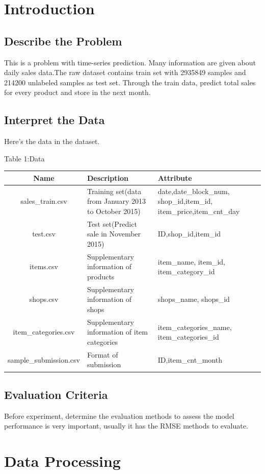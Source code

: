 \section{Introduction}\label{sec-intro}
\subsection{Describe the Problem}
\smallskip
This is a problem with time-series prediction. Many information are given about daily sales data.The raw dataset contains train set with 2935849 samples and 214200 unlabeled samples as test set. Through the train data, predict total sales for every product and store in the next month.
\subsection{Interpret the Data}
\smallskip
Here's the data in the dataset.\\
\bigskip
\centerline{\normalsize{Table 1:Data}}
\begin{tabular}{cp{4cm}p{4cm}}
	\hline
	Name&Description&Attribute\\
	\hline
	sales\_train.csv& Training set(data from January 2013 to October 2015)&date,date_block_num, shop_id,item_id, item_price,item_cnt_day\\
	test.csv& Test set(Predict sale in November 2015) & ID,shop_id,item_id\\
	items.csv& Supplementary information of products &item_name, item_id, item_category_id\\
	shops.csv& Supplementary information of shops & shops_name,  shops_id\\
	item_categories.csv& Supplementary information of item categories & item_categories_name, item_categories_id\\
	sample_submission.csv& Format of submission & ID,item_cnt_month\\
	\hline
\end{tabular}
\subsection{Evaluation Criteria}
Before experiment, determine the evaluation methods to assess the model performance is very important, usually it has the RMSE methods to evaluate.
\section{Data Processing} \label{sec-preliminaries}	
